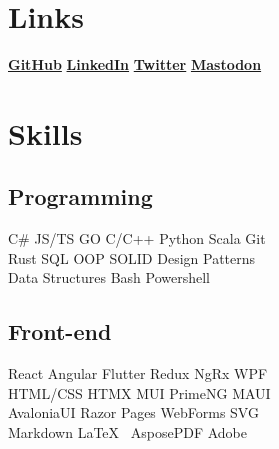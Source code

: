 \documentclass[letterpaper]{cv_12} %
\begin{document}
\begin{minipage}[t]{0.39\textwidth}%


    \section{Links}

    \href{https://github.com/foontzoot}{\bf GitHub} \textbullet{}
    \href{https://www.linkedin.com/in/sinisa-petkovic-b704034/}{\bf LinkedIn} \textbullet{}
    \href{https://twitter.com/SinisaPetkovic}{\bf Twitter} \textbullet{}
    \href{https://c.im/@foontzoot}{\bf Mastodon}

    \sectionspace%


    \section{Skills}

    \subsection{Programming}

    C\# \textbullet{} JS/TS \textbullet{} GO \textbullet{} C/C++
    \textbullet{} Python \textbullet{} Scala \textbullet{} Git\\
    Rust \textbullet{} SQL \textbullet{} OOP \textbullet{} SOLID
    \textbullet{} Design Patterns\\
    Data Structures \textbullet{} Bash \textbullet{} Powershell

    \sectionspace%

    \subsection{Front-end}

    React \textbullet{} Angular \textbullet{} Flutter \textbullet{} Redux
    \textbullet{} NgRx \textbullet{} WPF\\
    HTML/CSS \textbullet{} HTMX \textbullet{} MUI \textbullet{} PrimeNG
    \textbullet{} MAUI\\
    AvaloniaUI \textbullet{} Razor Pages \textbullet{} WebForms
    \textbullet{} SVG\\
    Markdown \textbullet{} \LaTeX\ \textbullet{} AsposePDF \textbullet{}
    Adobe


\end{minipage}
\end{document}
